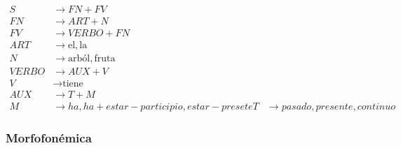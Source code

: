 \begin{align*}
	S &\rightarrow FN + FV \\
	FN &\rightarrow ART + N \\
	FV &\rightarrow VERBO + FN \\
	ART &\rightarrow \mbox{el}, \mbox{la}\\
	N &\rightarrow \mbox{arból}, \mbox{fruta}\\
	VERBO &\rightarrow AUX + V \\
	V &\rightarrow \mbox{tiene} \\
	AUX &\rightarrow T + M \\
	M &\rightarrow ha, ha + estar-participio, estar-presete
	T &\rightarrow pasado, presente, continuo
\end{align*}


\subsubsection{Morfofonémica}

